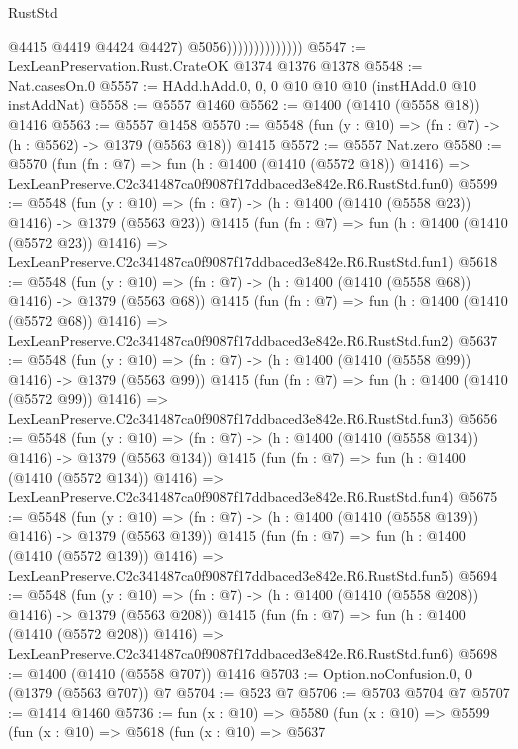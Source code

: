 \begin{lexlean}{RustStd}
\begin{coremodule}
                                  @4415
                                  @4419
                                  @4424
                                  @4427)
                                @5056))))))))))))))
@5547 := LexLeanPreservation.Rust.CrateOK @1374 @1376 @1378
@5548 := Nat.casesOn.{0}
@5557 := HAdd.hAdd.{0, 0, 0} @10 @10 @10 (instHAdd.{0} @10 instAddNat)
@5558 := @5557 @1460
@5562 := @1400 (@1410 (@5558 @18)) @1416
@5563 := @5557 @1458
@5570 := @5548 (fun (y : @10) => (fn : @7) -> (h : @5562) -> @1379 (@5563 @18)) @1415
@5572 := @5557 Nat.zero
@5580 := @5570
    (fun (fn : @7) =>
    fun (h : @1400 (@1410 (@5572 @18)) @1416) =>
    LexLeanPreserve.C2c341487ca0f9087f17ddbaced3e842e.R6.RustStd.fun0)
@5599 := @5548
    (fun (y : @10) => (fn : @7) -> (h : @1400 (@1410 (@5558 @23)) @1416) -> @1379 (@5563 @23))
    @1415
    (fun (fn : @7) =>
    fun (h : @1400 (@1410 (@5572 @23)) @1416) =>
    LexLeanPreserve.C2c341487ca0f9087f17ddbaced3e842e.R6.RustStd.fun1)
@5618 := @5548
    (fun (y : @10) => (fn : @7) -> (h : @1400 (@1410 (@5558 @68)) @1416) -> @1379 (@5563 @68))
    @1415
    (fun (fn : @7) =>
    fun (h : @1400 (@1410 (@5572 @68)) @1416) =>
    LexLeanPreserve.C2c341487ca0f9087f17ddbaced3e842e.R6.RustStd.fun2)
@5637 := @5548
    (fun (y : @10) => (fn : @7) -> (h : @1400 (@1410 (@5558 @99)) @1416) -> @1379 (@5563 @99))
    @1415
    (fun (fn : @7) =>
    fun (h : @1400 (@1410 (@5572 @99)) @1416) =>
    LexLeanPreserve.C2c341487ca0f9087f17ddbaced3e842e.R6.RustStd.fun3)
@5656 := @5548
    (fun (y : @10) => (fn : @7) -> (h : @1400 (@1410 (@5558 @134)) @1416) -> @1379 (@5563 @134))
    @1415
    (fun (fn : @7) =>
    fun (h : @1400 (@1410 (@5572 @134)) @1416) =>
    LexLeanPreserve.C2c341487ca0f9087f17ddbaced3e842e.R6.RustStd.fun4)
@5675 := @5548
    (fun (y : @10) => (fn : @7) -> (h : @1400 (@1410 (@5558 @139)) @1416) -> @1379 (@5563 @139))
    @1415
    (fun (fn : @7) =>
    fun (h : @1400 (@1410 (@5572 @139)) @1416) =>
    LexLeanPreserve.C2c341487ca0f9087f17ddbaced3e842e.R6.RustStd.fun5)
@5694 := @5548
    (fun (y : @10) => (fn : @7) -> (h : @1400 (@1410 (@5558 @208)) @1416) -> @1379 (@5563 @208))
    @1415
    (fun (fn : @7) =>
    fun (h : @1400 (@1410 (@5572 @208)) @1416) =>
    LexLeanPreserve.C2c341487ca0f9087f17ddbaced3e842e.R6.RustStd.fun6)
@5698 := @1400 (@1410 (@5558 @707)) @1416
@5703 := Option.noConfusion.{0, 0} (@1379 (@5563 @707)) @7
@5704 := @523 @7
@5706 := @5703 @5704 @7
@5707 := @1414 @1460
@5736 := fun (x : @10) =>
  @5580
    (fun (x : @10) =>
    @5599
      (fun (x : @10) =>
      @5618
        (fun (x : @10) =>
        @5637

\end{coremodule}
\end{lexlean}
